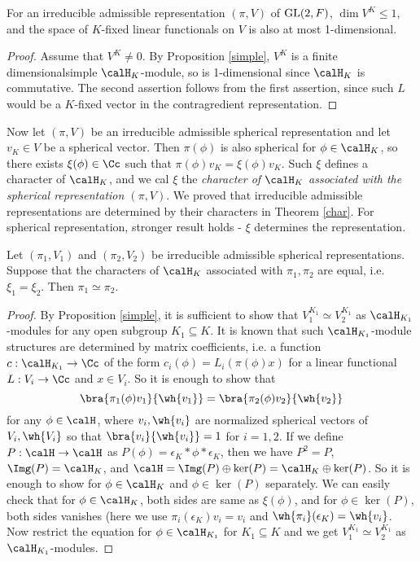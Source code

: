 \begin{theorem}
For an irreducible admissible representation $(\pi, V)$ of $\mathrm{GL}(2, F)$,  $\dim V^{K} \leq 1$, and the space of $K$-fixed linear functionals on $V$ is also at most 1-dimensional. 
\end{theorem}
\begin{proof}
Assume that $V^{K} \neq 0$. By Proposition \ref{simple}, $V^{K}$ is a finite dimensionalsimple $\calH_K$-module, so is 1-dimensional since $\calH_K$ is commutative. 
The second assertion follows from the first assertion, since such $L$ would be a $K$-fixed vector in the contragredient representation. 
\end{proof}

Now let $(\pi, V)$ be an irreducible admissible spherical representation and let $v_K\in V$ be a spherical vector. 
Then $\pi(\phi)$ is also spherical for $\phi\in \calH_K$, so there exists $\xi(\phi)\in \Cc$ such that $\pi(\phi)v_K = \xi(\phi)v_K$. 
Such $\xi$ defines a character of $\calH_{K}$, and we cal $\xi$ the \emph{character of $\calH_K$ associated with the spherical representation $(\pi, V)$}. 
We proved that irreducible admissible representations are determined by their characters in Theorem \ref{char}. 
For spherical representation, stronger result holds - $\xi$ determines the representation. 
\begin{theorem}
\label{sphchar}
Let $(\pi_1, V_1)$ and $(\pi_2, V_2)$ be irreducible admissible spherical representations. 
Suppose that the characters of $\calH_K$ associated with $\pi_1, \pi_2$ are equal, i.e. $\xi_1 = \xi_2$. Then $\pi_1\simeq \pi_2$. 
\end{theorem}
\begin{proof}
By Proposition \ref{simple}, it is sufficient to show that $V_{1}^{K_1}\simeq V_{2}^{K_1}$ as $\calH_{K_{1}}$-modules for any open subgroup $K_1\subseteq K$. 
It is known that such $\calH_{K_{1}}$-module structures are determined by matrix coefficients, i.e. a function $c:\calH_{K_1} \to \Cc$ of the form $c_i(\phi) = L_i(\pi(\phi)x)$ for a linear functional $L:V_i\to \Cc$ and $x\in V_i$. 
So it is enough to show that 
$$
\bra{\pi_1(\phi)v_1}{\wh{v_1}} = \bra{\pi_2(\phi)v_2}{\wh{v_2}}
$$
for any $\phi\in \calH$, where $v_i, \wh{v_i}$ are normalized spherical vectors of $V_i, \wh{V_i}$ so that $\bra{v_i}{\wh{v_i}} = 1$ for $i= 1,2$.
 If we define $P: \calH\to \calH$ as $P(\phi) = \epsilon_K * \phi * \epsilon_K$, then we have $P^{2} = P$, $\Img(P) = \calH_K$, and $\calH = \Img(P) \oplus \ker(P) = \calH_K \oplus \ker(P)$. 
So it is enough to show for $\phi\in \calH_K$ and $\phi\in \ker(P)$ separately. 
We can easily check that for $\phi \in \calH_K$, both sides are same as $\xi(\phi)$, and for $\phi\in \ker(P)$, both sides vanishes (here we use $\pi_i(\epsilon_K) v_i = v_i$ and $\wh{\pi_i}(\epsilon_K) = \wh{v_i}$. 
Now restrict the equation for $\phi\in \calH_{K_1}$ for $K_1\subseteq K$ and we get $V_1^{K_1}\simeq V_2^{K_1}$ as $\calH_{K_1}$-modules. 
\end{proof}

